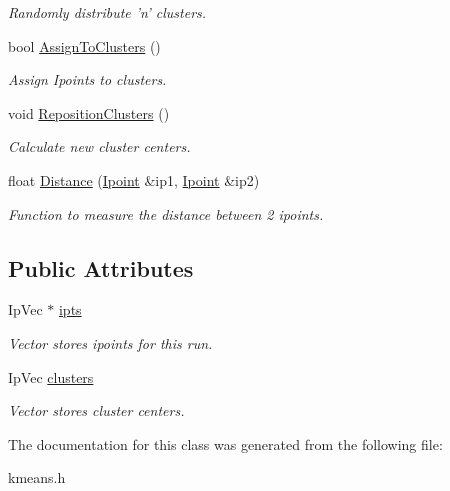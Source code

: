 \begin{DoxyCompactItemize}
\begin{DoxyCompactList}\small\item\em Randomly distribute 'n' clusters. \end{DoxyCompactList}\item 
\hypertarget{classKmeans_a47c04cccafb55032e85987cfceb7c95c}{bool \hyperlink{classKmeans_a47c04cccafb55032e85987cfceb7c95c}{Assign\-To\-Clusters} ()}\label{classKmeans_a47c04cccafb55032e85987cfceb7c95c}

\begin{DoxyCompactList}\small\item\em Assign Ipoints to clusters. \end{DoxyCompactList}\item 
\hypertarget{classKmeans_ab0ca7a879e310b20843adb01c4487673}{void \hyperlink{classKmeans_ab0ca7a879e310b20843adb01c4487673}{Reposition\-Clusters} ()}\label{classKmeans_ab0ca7a879e310b20843adb01c4487673}

\begin{DoxyCompactList}\small\item\em Calculate new cluster centers. \end{DoxyCompactList}\item 
\hypertarget{classKmeans_a63c4aaf0a9ea1015525f3ac3d84ca516}{float \hyperlink{classKmeans_a63c4aaf0a9ea1015525f3ac3d84ca516}{Distance} (\hyperlink{classIpoint}{Ipoint} \&ip1, \hyperlink{classIpoint}{Ipoint} \&ip2)}\label{classKmeans_a63c4aaf0a9ea1015525f3ac3d84ca516}

\begin{DoxyCompactList}\small\item\em Function to measure the distance between 2 ipoints. \end{DoxyCompactList}\end{DoxyCompactItemize}
\subsection*{Public Attributes}
\begin{DoxyCompactItemize}
\item 
\hypertarget{classKmeans_abed0349d08279cf3bc8884bf47057b86}{Ip\-Vec $\ast$ \hyperlink{classKmeans_abed0349d08279cf3bc8884bf47057b86}{ipts}}\label{classKmeans_abed0349d08279cf3bc8884bf47057b86}

\begin{DoxyCompactList}\small\item\em Vector stores ipoints for this run. \end{DoxyCompactList}\item 
\hypertarget{classKmeans_a934a2bb64012d84c3b8f5d34dbd63237}{Ip\-Vec \hyperlink{classKmeans_a934a2bb64012d84c3b8f5d34dbd63237}{clusters}}\label{classKmeans_a934a2bb64012d84c3b8f5d34dbd63237}

\begin{DoxyCompactList}\small\item\em Vector stores cluster centers. \end{DoxyCompactList}\end{DoxyCompactItemize}


The documentation for this class was generated from the following file\-:\begin{DoxyCompactItemize}
\item 
kmeans.\-h\end{DoxyCompactItemize}
